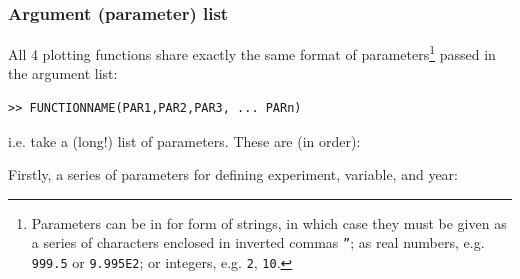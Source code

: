\documentclass[11pt,fleqn]{book} %
\begin{document}
\subsubsection{Argument (parameter) list}

All 4 plotting functions share exactly the same format of parameters\footnote{Parameters can be in for form of strings, in which case they must be given as a series of characters enclosed in inverted commas \texttt{''}; as real numbers, e.g. \texttt{999.5} or \texttt{9.995E2}; or integers, e.g. \texttt{2}, \texttt{10}.} passed in the argument list:

\vspace{-2mm}
\small\begin{verbatim}
>> FUNCTIONNAME(PAR1,PAR2,PAR3, ... PARn)
\end{verbatim}\normalsize
\vspace{-2mm}
\noindent i.e. take a (long!) list of parameters. These are (in order):

\vspace{2mm}
\noindent Firstly, a series of parameters for defining experiment, variable, and year:
\end{document}
